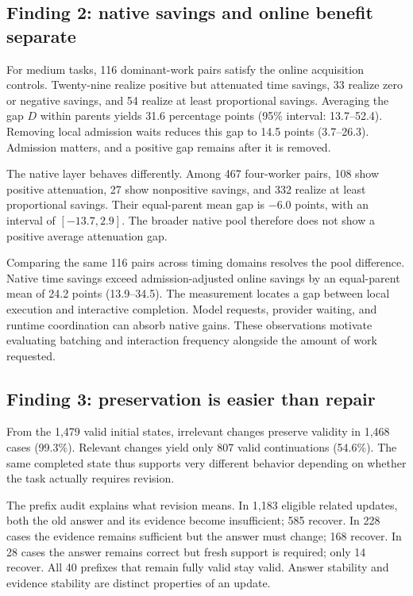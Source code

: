 \documentclass[11pt]{article}
\begin{document}
\subsection{Finding 2: native savings and online benefit separate}

For medium tasks, 116 dominant-work pairs satisfy the online acquisition controls. Twenty-nine realize positive but attenuated time savings, 33 realize zero or negative savings, and 54 realize at least proportional savings. Averaging the gap $D$ within parents yields 31.6 percentage points (95\% interval: 13.7--52.4). Removing local admission waits reduces this gap to 14.5 points (3.7--26.3). Admission matters, and a positive gap remains after it is removed.

The native layer behaves differently. Among 467 four-worker pairs, 108 show positive attenuation, 27 show nonpositive savings, and 332 realize at least proportional savings. Their equal-parent mean gap is $-6.0$ points, with an interval of $[-13.7,2.9]$. The broader native pool therefore does not show a positive average attenuation gap.

Comparing the same 116 pairs across timing domains resolves the pool difference. Native time savings exceed admission-adjusted online savings by an equal-parent mean of 24.2 points (13.9--34.5). The measurement locates a gap between local execution and interactive completion. Model requests, provider waiting, and runtime coordination can absorb native gains. These observations motivate evaluating batching and interaction frequency alongside the amount of work requested.

\subsection{Finding 3: preservation is easier than repair}

From the 1,479 valid initial states, irrelevant changes preserve validity in 1,468 cases (99.3\%). Relevant changes yield only 807 valid continuations (54.6\%). The same completed state thus supports very different behavior depending on whether the task actually requires revision.

The prefix audit explains what revision means. In 1,183 eligible related updates, both the old answer and its evidence become insufficient; 585 recover. In 228 cases the evidence remains sufficient but the answer must change; 168 recover. In 28 cases the answer remains correct but fresh support is required; only 14 recover. All 40 prefixes that remain fully valid stay valid. Answer stability and evidence stability are distinct properties of an update.
\end{document}
